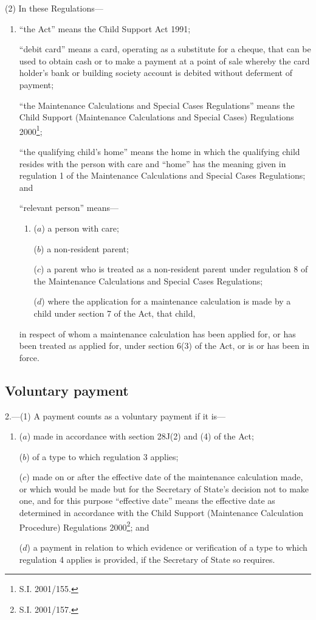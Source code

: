 \documentclass[12pt,a4paper]{article}
\begin{document}
(2) In these Regulations—
\begin{enumerate}\item[]
“the Act” means the Child Support Act 1991;

“debit card” means a card, operating as a substitute for a cheque, that can be used to obtain cash or to make a payment at a point of sale whereby the card holder’s bank or building society account is debited without deferment of payment;

“the Maintenance Calculations and Special Cases Regulations” means the Child Support (Maintenance Calculations and Special Cases) Regulations 2000\footnote{\frenchspacing S.I. 2001/155.};

“the qualifying child’s home” means the home in which the qualifying child resides with the person with care and “home” has the meaning given in regulation 1 of the Maintenance Calculations and Special Cases Regulations; and

“relevant person” means—
\begin{enumerate}\item[]
($a$) 
a person with care;

($b$) 
a non-resident parent;

($c$) 
a parent who is treated as a non-resident parent under regulation 8 of the Maintenance Calculations and Special Cases Regulations;

($d$) 
where the application for a maintenance calculation is made by a child under section 7 of the Act, that child,
\end{enumerate}
in respect of whom a maintenance calculation has been applied for, or has been treated as applied for, under section 6(3) of the Act, or is or has been in force.
\end{enumerate}

\subsection[2. Voluntary payment]{Voluntary payment}

2.---(1)  A payment counts as a voluntary payment if it is—
\begin{enumerate}\item[]
($a$) made in accordance with section 28J(2) and (4) of the Act;

($b$) of a type to which regulation 3 applies;

($c$) made on or after the effective date of the maintenance calculation made, or which would be made but for the Secretary of State’s decision not to make one, and for this purpose “effective date” means the effective date as determined in accordance with the Child Support (Maintenance Calculation Procedure) Regulations 2000\footnote{\frenchspacing S.I. 2001/157.}; and

($d$) a payment in relation to which evidence or verification of a type to which regulation 4 applies is provided, if the Secretary of State so requires.
\end{enumerate}
\end{document}

